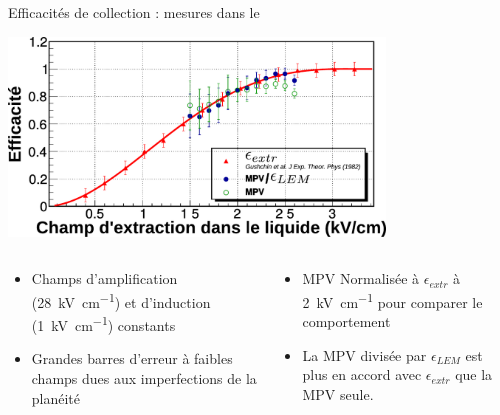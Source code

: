     \begin{frame}{Efficacités de collection : mesures dans le \TOO{}}
        \begin{scriptsize}
            \centering
            \includegraphics[width=0.75\textwidth]{./pictures/comp_311_eff.pdf}
            \vspace{0.2cm}
            \begin{columns}
                \begin{column}{0.5\textwidth}
                    \begin{itemize}
                        \item Champs d'amplification (\SI{28}{\kilo\volt\per\centi\meter}) et d'induction (\SI{1}{\kilo\volt\per\centi\meter}) constants
                        \item Grandes barres d'erreur à faibles champs dues aux imperfections de la planéité
                    \end{itemize}
                \end{column}
                \begin{column}{0.5\textwidth}
                    \begin{itemize}
                        \item MPV Normalisée à $\epsilon_{extr}$ à \SI{2}{\kilo\volt\per\centi\meter} pour comparer le comportement
                        \item La MPV divisée par  $\epsilon_{LEM}$ est plus en accord avec $\epsilon_{extr}$ que la MPV seule.
                    \end{itemize}
                \end{column}
            \end{columns}
        \end{scriptsize}
    \end{frame}

